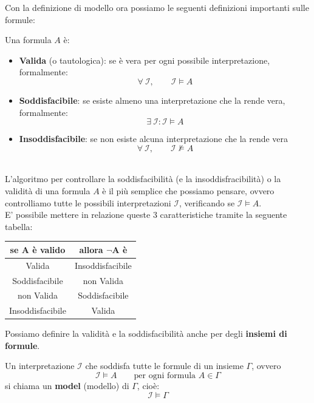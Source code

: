 \noindent Con la definizione di modello ora possiamo le seguenti definizioni importanti sulle formule:\smallskip\\
 \colorbox{SALZO}{\parbox{\dimexpr\linewidth-2\fboxsep}{\begin{definition}
   Una formula $A$ è:
   \begin{itemize}
    \item \textbf{Valida} (o tautologica): se è vera per ogni possibile interpretazione, formalmente:
    \[   \forall \ \mathcal{I}, \qquad \mathcal{I} \models A    \]

    \item \textbf{Soddisfacibile}: se esiste almeno una interpretazione che la rende vera, formalmente:
    \[   \exists \ \mathcal{I} : \mathcal{I} \models A      \]

    \item \textbf{Insoddisfacibile}: se non esiste alcuna interpretazione che la rende vera 
    \[     \forall \ \mathcal{I}, \qquad \mathcal{I} \not\models A  \]

   \end{itemize}
\end{definition}}}\smallskip\\
L'algoritmo per controllare la soddisfacibilità (e la insoddisfracibilità) o la validità di una formula $A$ è il più semplice che possiamo pensare, ovvero controlliamo tutte le possibili 
interpretazioni $\mathcal{I}$, verificando se $\mathcal{I} \models A$.\\
E' possibile mettere in relazione queste 3 caratteristiche tramite la seguente tabella:
\begin{center}
    \begin{tabular}{c c}
        \hline
        \textbf{se $\bm{A}$ è valido}  & \textbf{allora $\bm{\neg A}$ è }\\
        \hline
        \hline
        Valida & Insoddisfacibile \\
        \hline
        Soddisfacibile & non Valida \\
        \hline
        non Valida & Soddisfacibile \\
        \hline 
        Insoddisfacibile & Valida \\
        \hline
    \end{tabular}
\end{center}
Possiamo definire la validità e la soddisfacibilità anche per degli \textbf{insiemi di formule}.\smallskip\\
 \colorbox{SALZO}{\parbox{\dimexpr\linewidth-2\fboxsep}{\begin{definition}
   Un interpretazione $\mathcal{I}$ che soddisfa tutte le formule di un insieme $\Gamma$, ovvero 
   \[    \mathcal{I} \models A \qquad \text{per ogni formula } A \in \Gamma    \]
   si chiama un \textbf{model} (modello) di $\Gamma$, cioè:
   \[     \mathcal{I}\models \Gamma  \] 
\end{definition}}}\smallskip\\
